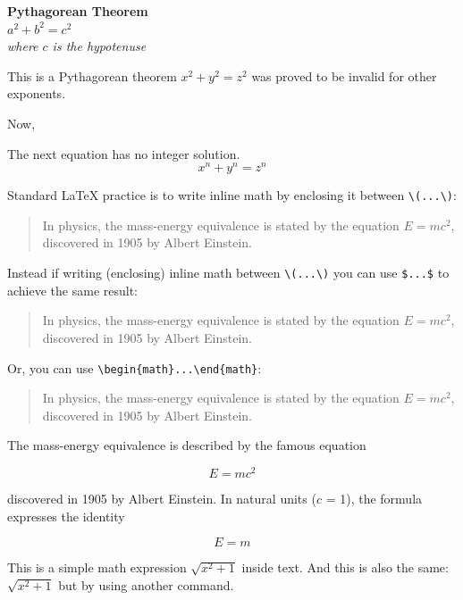 \documentclass{article}
\begin{document}
	\begin{center}
		\textbf{\Large Pythagorean Theorem} \\
		\vspace{0.5cm}
		$\boxed{a^2 + b^2 = c^2}$ \\
		\vspace{0.2cm}
		\textit{where $c$ is the hypotenuse}
	\end{center}

This is a Pythagorean theorem \(x^2 + y^2 = z^2\) was proved to be 
invalid for other exponents.


Now, 

The next equation has no integer solution.
\[x^n + y^n = z^n\]

\noindent Standard \LaTeX{} practice is to write inline math by enclosing it between \verb|\(...\)|:

\begin{quote}
	In physics, the mass-energy equivalence is stated 
	by the equation \(E=mc^2\), discovered in 1905 by Albert Einstein.
\end{quote}

\noindent Instead if writing (enclosing) inline math between \verb|\(...\)| you can use \texttt{\$...\$} to achieve the same result:

\begin{quote}
	In physics, the mass-energy equivalence is stated 
	by the equation $E=mc^2$, discovered in 1905 by Albert Einstein.
\end{quote}

\noindent Or, you can use \verb|\begin{math}...\end{math}|:

\begin{quote}
	In physics, the mass-energy equivalence is stated 
	by the equation \begin{math}E=mc^2\end{math}, discovered in 1905 by Albert Einstein.
\end{quote}

The mass-energy equivalence is described by the famous equation

\[E=mc^2\]

discovered in 1905 by Albert Einstein. 
In natural units ($c$ = 1), the formula expresses the identity

\begin{equation}
	E=m
\end{equation}

This is a simple math expression \(\sqrt{x^2+1}\) inside text. 
And this is also the same: 
\begin{math}
	\sqrt{x^2+1}
\end{math}
but by using another command.
\end{document}
